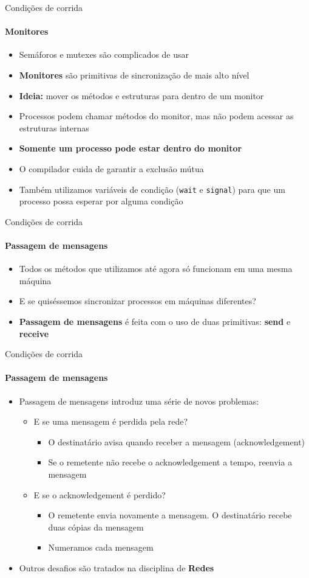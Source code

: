 \documentclass{beamer}
\begin{document}
\begin{frame}{Condições de corrida}
	\framesubtitle{Monitores}
	\begin{itemize}
		\item Semáforos e mutexes são complicados de usar
		\item \textbf{Monitores} são primitivas de sincronização de mais alto nível
		\item \textbf{Ideia:} mover os métodos e estruturas para dentro de um monitor
		\item Processos podem chamar métodos do monitor, mas não podem acessar as estruturas internas
		\item \textbf{Somente um processo pode estar dentro do monitor}
		\item O compilador cuida de garantir a exclusão mútua
		\item Também utilizamos variáveis de condição (\texttt{wait} e \texttt{signal}) para que um processo possa esperar por alguma condição
	\end{itemize}
\end{frame}
\begin{frame}{Condições de corrida}
	\framesubtitle{Passagem de mensagens}
	\begin{itemize}
		\item Todos os métodos que utilizamos até agora só funcionam em uma mesma máquina
		\item E se quiséssemos sincronizar processos em máquinas diferentes?
		\item \textbf{Passagem de mensagens} é feita com o uso de duas primitivas: \textbf{send} e \textbf{receive}
	\end{itemize}
\end{frame}
\begin{frame}{Condições de corrida}
	\framesubtitle{Passagem de mensagens}
	\begin{itemize}
		\item Passagem de mensagens introduz uma série de novos problemas:
		\begin{itemize}
			\item E se uma mensagem é perdida pela rede?\pause
			\begin{itemize}
				\item O destinatário avisa quando receber a mensagem (acknowledgement)
				\item Se o remetente não recebe o acknowledgement a tempo, reenvia a mensagem
			\end{itemize}\pause
			\item E se o acknowledgement é perdido?\pause
			\begin{itemize}
				\item O remetente envia novamente a mensagem. O destinatário recebe duas cópias da mensagem
				\item Numeramos cada mensagem
			\end{itemize}
		\end{itemize}
		\item Outros desafios são tratados na disciplina de \textbf{Redes}
	\end{itemize}
\end{frame}
\end{document}
